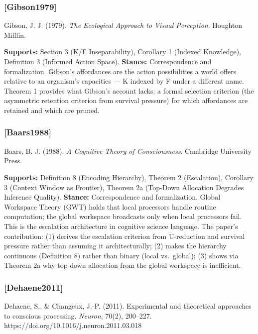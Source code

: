 \documentclass[
]{article}
\begin{document}
\subsubsection{{[}Gibson1979{]}}\label{gibson1979}

Gibson, J. J. (1979). \emph{The Ecological Approach to Visual
Perception}. Houghton Mifflin.

\textbf{Supports:} Section 3 (K/F Inseparability), Corollary 1 (Indexed
Knowledge), Definition 3 (Informed Action Space). \textbf{Stance:}
Correspondence and formalization. Gibson's affordances are the action
possibilities a world offers relative to an organism's capacities --- K
indexed by F under a different name. Theorem 1 provides what Gibson's
account lacks: a formal selection criterion (the asymmetric retention
criterion from survival pressure) for which affordances are retained and
which are pruned.

\subsubsection{{[}Baars1988{]}}\label{baars1988}

Baars, B. J. (1988). \emph{A Cognitive Theory of Consciousness}.
Cambridge University Press.

\textbf{Supports:} Definition 8 (Encoding Hierarchy), Theorem 2
(Escalation), Corollary 3 (Context Window as Frontier), Theorem 2a
(Top-Down Allocation Degrades Inference Quality). \textbf{Stance:}
Correspondence and formalization. Global Workspace Theory (GWT) holds
that local processors handle routine computation; the global workspace
broadcasts only when local processors fail. This is the escalation
architecture in cognitive science language. The paper's contribution:
(1) derives the escalation criterion from U-reduction and survival
pressure rather than assuming it architecturally; (2) makes the
hierarchy continuous (Definition 8) rather than binary (local
vs.~global); (3) shows via Theorem 2a why top-down allocation from the
global workspace is inefficient.

\subsubsection{{[}Dehaene2011{]}}\label{dehaene2011}

Dehaene, S., \& Changeux, J.-P. (2011). Experimental and theoretical
approaches to conscious processing. \emph{Neuron}, 70(2), 200--227.
https://doi.org/10.1016/j.neuron.2011.03.018
\end{document}

